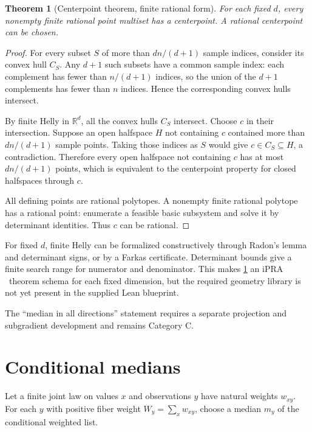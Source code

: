 \documentclass[11pt]{article}
\newtheorem{theorem}{Theorem}[section]
\newcommand{\iPRA}{\ensuremath{\mathrm{iPRA}}}
\newcommand{\Real}{\mathbb R}
\begin{document}
\begin{theorem}[Centerpoint theorem, finite rational form]\label{thm:centerpoint}
For each fixed $d$, every nonempty finite rational point multiset has a
centerpoint.  A rational centerpoint can be chosen.
\end{theorem}

\begin{proof}
For every subset $S$ of more than $dn/(d+1)$ sample indices, consider its
convex hull $C_S$.  Any $d+1$ such subsets have a common sample index: each
complement has fewer than $n/(d+1)$ indices, so the union of the $d+1$
complements has fewer than $n$ indices.  Hence the corresponding convex hulls
intersect.

By finite Helly in $\Real^d$, all the convex hulls $C_S$ intersect.  Choose
$c$ in their intersection.  Suppose an open halfspace $H$ not containing $c$
contained more than $dn/(d+1)$ sample points.  Taking those indices as $S$
would give $c\in C_S\subseteq H$, a contradiction.  Therefore every open
halfspace not containing $c$ has at most $dn/(d+1)$ points, which is equivalent
to the centerpoint property for closed halfspaces through $c$.

All defining points are rational polytopes.  A nonempty finite rational
polytope has a rational point: enumerate a feasible basic subsystem and solve
it by determinant identities.  Thus $c$ can be rational.
\end{proof}

For fixed $d$, finite Helly can be formalized constructively through Radon's
lemma and determinant signs, or by a Farkas certificate.  Determinant bounds
give a finite search range for numerator and denominator.  This makes
\cref{thm:centerpoint} an \iPRA\ theorem schema for each fixed dimension, but
the required geometry library is not yet present in the supplied Lean
blueprint.

The ``median in all directions'' statement requires a separate projection and
subgradient development and remains Category C.

\section{Conditional medians}

Let a finite joint law on values $x$ and observations $y$ have natural weights
$w_{xy}$.  For each $y$ with positive fiber weight
$W_y=\sum_xw_{xy}$, choose a median $m_y$ of the conditional weighted list.
\end{document}
